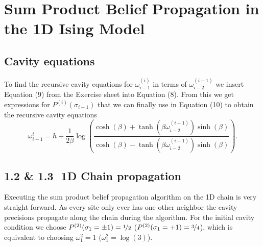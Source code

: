 \documentclass[main.tex]{subfiles}
\begin{document}
\section{Sum Product Belief Propagation in the 1D Ising Model}


\subsection{Cavity equations}

To find the recursive cavity equations for $\omega_{ i-1 }^{(i)}$ in terms of 
$\omega_{ i-2 } ^{(i-1)}$ we insert Equation (9) from the Exercise sheet into
Equation (8). From this we get expressions for $P^{(i)}(\sigma_{ i-1 } )$ that we
can finally use in Equation (10) to obtain the recursive cavity equations 
\[
    \omega^{i}_{ i-1 } = h + \frac{1}{2\beta} \log( 
    \frac{
        \cosh( \beta  ) + \tanh( \beta \omega_{ i-2 } ^{(i-1)} ) \sinh( \beta )  
    }{
        \cosh( \beta  ) - \tanh( \beta \omega_{ i-2 } ^{(i-1)} ) \sinh( \beta )  
    }
    ) 
.\] 


\subsection*{1.2 \& 1.3\,\, 1D Chain propagation}
Executing the sum product belief propagation algorithm on the 1D chain is very straight forward.
As every site only ever has one other neighbor the cavity precisions propagate along the chain during the algorithm.
For the initial cavity condition we choose $P^{(2)}(\sigma_{ 1 } = \pm 1) = \nicefrac{1}{2}$ ($P^{(2)}(\sigma_{ 1 } = + 1) = \nicefrac{3}{4}$),
which is equivalent to choosing $\omega_{ 1 } ^{2} = 1$ ($\omega_{ 1 } ^{2} = \log( 3 ) $).
\end{document}
